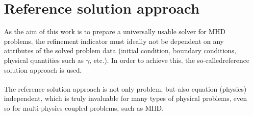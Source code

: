 \section{Reference solution approach}
As the aim of this work is to prepare a universally usable solver for MHD problems, the refinement indicator  must ideally not be dependent on any attributes of the solved problem data (initial condition, boundary conditions, physical quantities such as $\gamma$, etc.). In order to achieve this, the so-called{reference solution} approach is used.
\paragraph{}
The reference solution approach is not only problem, but also equation (physics) independent, which is truly invaluable for many types of physical problems, even so for multi-physics coupled problems, such as MHD.
